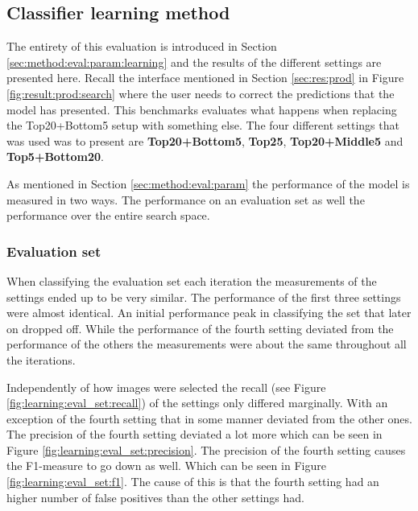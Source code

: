 
\subsection{Classifier learning method}
\label{sec:res:learning}

The entirety of this evaluation is introduced in Section \ref{sec:method:eval:param:learning} and the results of the different settings are presented here. 
Recall the interface mentioned in Section \ref{sec:res:prod} in Figure \ref{fig:result:prod:search} where the user needs to correct the predictions that the model has presented. This benchmarks evaluates what happens when replacing the Top20+Bottom5 setup with something else. The four different settings that was used was to present are \textbf{Top20+Bottom5}, \textbf{Top25}, \textbf{Top20+Middle5} and \textbf{Top5+Bottom20}.

As mentioned in Section \ref{sec:method:eval:param} the performance of the model is measured in two ways. The performance on an evaluation set as well the performance over the entire search space.

\subsubsection{Evaluation set}
\label{sec:res:learning:eval}
When classifying the evaluation set each iteration the measurements of the settings ended up to be very similar. The performance of the first three settings were almost identical. An initial performance peak in classifying the set that later on dropped off. While the performance of the fourth setting deviated from the performance of the others the measurements were about the same throughout all the iterations.

Independently of how images were selected the recall (see Figure \ref{fig:learning:eval_set:recall}) of the settings only differed marginally. With an exception of the fourth setting that in some manner deviated from the other ones. 
The precision of the fourth setting deviated a lot more which can be seen in Figure \ref{fig:learning:eval_set:precision}. The precision of the fourth setting causes the F1-measure to go down as well. Which can be seen in Figure \ref{fig:learning:eval_set:f1}. The cause of this is that the fourth setting had an higher number of false positives than the other settings had.

